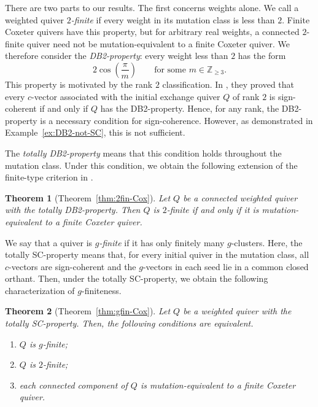 \documentclass[11pt,reqno]{amsart}
\numberwithin{equation}{section}
\theoremstyle{definition}
\theoremstyle{plain}
\newtheorem{maintheorem}{Theorem}
\begin{document}
	There are two parts to our results. The first concerns weights alone. We call a weighted quiver \emph{$2$-finite} if every weight in its mutation class is less than $2$. Finite Coxeter quivers have this property, but for arbitrary real weights, a connected $2$-finite quiver need not be mutation-equivalent to a finite Coxeter quiver. We therefore consider the \emph{DB2-property}: every weight less than $2$ has the form
	\[
	2\cos\left(\frac{\pi}{m}\right)\qquad\text{for some }m\in\mathbb Z_{\geq3}.
	\]
	This property is motivated by the rank $2$ classification. In \cite{AC25}, they proved that every $c$-vector associated with the initial exchange quiver $Q$ of rank $2$ is sign-coherent if and only if $Q$ has the DB2-property. Hence, for any rank, the DB2-property is a necessary condition for sign-coherence. However, as demonstrated in Example~\ref{ex:DB2-not-SC}, this is not sufficient.
	\par
	The \emph{totally DB2-property} means that this condition holds throughout the mutation class. Under this condition, we obtain the following extension of the finite-type criterion in \cite{FZ03a}.
	
	\begin{maintheorem}[Theorem~\ref{thm:2fin-Cox}]\label{main:weights}
		Let $Q$ be a connected weighted quiver with the totally DB2-property. Then $Q$ is $2$-finite if and only if it is mutation-equivalent to a finite Coxeter quiver.
	\end{maintheorem}
	
	We say that a quiver is \emph{$g$-finite} if it has only finitely many $g$-clusters. Here, the totally SC-property means that, for every initial quiver in the mutation class, all $c$-vectors are sign-coherent and the $g$-vectors in each seed lie in a common closed orthant. Then, under the totally SC-property, we obtain the following characterization of $g$-finiteness.
	
	\begin{maintheorem}[Theorem~\ref{thm:gfin-Cox}]\label{main:finite}
		Let $Q$ be a weighted quiver with the totally SC-property. Then, the following conditions are equivalent.
		\begin{enumerate}[label=\textup{(\arabic*)}]
			\item $Q$ is $g$-finite; \label{item:gfinite}
			\item $Q$ is $2$-finite; \label{item:2finite}
			\item each connected component of $Q$ is mutation-equivalent to a finite Coxeter quiver. \label{item:coxeter}
		\end{enumerate}
	\end{maintheorem}
	
\end{document}
